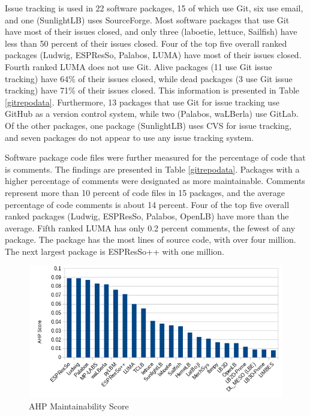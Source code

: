 \documentclass[12pt, notitlepage]{article}
\begin{document}
Issue tracking is used in 22 software packages, 15 of which use Git, six use email, and one (SunlightLB) uses SourceForge. Most software packages that use Git have most of their issues closed, and only three (laboetie, lettuce, Sailfish) have less than 50 percent of their issues closed. Four of the top five overall ranked packages (Ludwig, ESPResSo, Palabos, LUMA) have most of their issues closed. Fourth ranked LUMA does not use Git. Alive packages (11 use Git issue tracking) have 64\% of their issues closed, while dead packages (3 use Git issue tracking) have 71\% of their issues closed. This information is presented in Table \ref{gitrepodata}. Furthermore, 13 packages that use Git for issue tracking use GitHub as a version control system, while two (Palabos, waLBerla) use GitLab. Of the other packages, one package (SunlightLB) uses CVS for issue tracking, and seven packages do not appear to use any issue tracking system.

Software package code files were further measured for the percentage of code that is comments. The findings are presented in Table \ref{gitrepodata}. Packages with a higher percentage of comments were designated as more maintainable. Comments represent more than 10 percent of code files in 15 packages, and the average percentage of code comments is about 14 percent. Four of the top five overall ranked packages (Ludwig, ESPResSo, Palabos, OpenLB) have more than the average. Fifth ranked LUMA has only 0.2 percent comments, the fewest of any package. The package has the most lines of source code, with over four million. The next largest package is ESPResSo++ with one million.

\begin{figure}[h!]
	\begin{center}
		\includegraphics[width=1.0\textwidth]{maintainability_chart}
		\caption{AHP Maintainability Score}
		\label{Fig_Maintainability}
	\end{center}
\end{figure}
\end{document}
